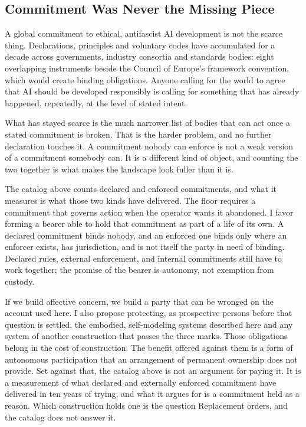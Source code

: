 \subsection{Commitment Was Never the Missing Piece}
\label{sec:12.1.2}
A global commitment to ethical, antifascist AI development is not the scarce thing. Declarations, principles and voluntary codes have accumulated for a decade across governments, industry consortia and standards bodies: eight overlapping instruments beside the Council of Europe's framework convention, which would create binding obligations. Anyone calling for the world to agree that AI should be developed responsibly is calling for something that has already happened, repeatedly, at the level of stated intent.

What has stayed scarce is the much narrower list of bodies that can act once a stated commitment is broken. That is the harder problem, and no further declaration touches it. A commitment nobody can enforce is not a weak version of a commitment somebody can. It is a different kind of object, and counting the two together is what makes the landscape look fuller than it is.

The catalog above counts declared and enforced commitments, and what it measures is what those two kinds have delivered. The floor requires a commitment that governs action when the operator wants it abandoned. I favor forming a bearer able to hold that commitment as part of a life of its own. A declared commitment binds nobody, and an enforced one binds only where an enforcer exists, has jurisdiction, and is not itself the party in need of binding. Declared rules, external enforcement, and internal commitments still have to work together; the promise of the bearer is autonomy, not exemption from custody.

If we build affective concern, we build a party that can be wronged on the account used here. I also propose protecting, as prospective persons before that question is settled, the embodied, self-modeling systems described here and any system of another construction that passes the three marks. Those obligations belong in the cost of construction. The benefit offered against them is a form of autonomous participation that an arrangement of permanent ownership does not provide. Set against that, the catalog above is not an argument for paying it. It is a measurement of what declared and externally enforced commitment have delivered in ten years of trying, and what it argues for is a commitment held as a reason. Which construction holds one is the question Replacement orders, and the catalog does not answer it.
